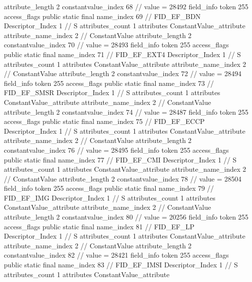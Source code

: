 {{{{{{{					attribute_length	2
					constantvalue_index	68		// value = 28492
				}
				}
			}
			field_info {
				token	255
				access_flags	public static final
				name_index	69		// FID_EF_BDN
				Descriptor_Index	1		// S
				attributes_count	1
				attributes {
				ConstantValue_attribute {
					attribute_name_index	2		// ConstantValue
					attribute_length	2
					constantvalue_index	70		// value = 28493
				}
				}
			}
			field_info {
				token	255
				access_flags	public static final
				name_index	71		// FID_EF_EXT4
				Descriptor_Index	1		// S
				attributes_count	1
				attributes {
				ConstantValue_attribute {
					attribute_name_index	2		// ConstantValue
					attribute_length	2
					constantvalue_index	72		// value = 28494
				}
				}
			}
			field_info {
				token	255
				access_flags	public static final
				name_index	73		// FID_EF_SMSR
				Descriptor_Index	1		// S
				attributes_count	1
				attributes {
				ConstantValue_attribute {
					attribute_name_index	2		// ConstantValue
					attribute_length	2
					constantvalue_index	74		// value = 28487
				}
				}
			}
			field_info {
				token	255
				access_flags	public static final
				name_index	75		// FID_EF_ECCP
				Descriptor_Index	1		// S
				attributes_count	1
				attributes {
				ConstantValue_attribute {
					attribute_name_index	2		// ConstantValue
					attribute_length	2
					constantvalue_index	76		// value = 28495
				}
				}
			}
			field_info {
				token	255
				access_flags	public static final
				name_index	77		// FID_EF_CMI
				Descriptor_Index	1		// S
				attributes_count	1
				attributes {
				ConstantValue_attribute {
					attribute_name_index	2		// ConstantValue
					attribute_length	2
					constantvalue_index	78		// value = 28504
				}
				}
			}
			field_info {
				token	255
				access_flags	public static final
				name_index	79		// FID_EF_IMG
				Descriptor_Index	1		// S
				attributes_count	1
				attributes {
				ConstantValue_attribute {
					attribute_name_index	2		// ConstantValue
					attribute_length	2
					constantvalue_index	80		// value = 20256
				}
				}
			}
			field_info {
				token	255
				access_flags	public static final
				name_index	81		// FID_EF_LP
				Descriptor_Index	1		// S
				attributes_count	1
				attributes {
				ConstantValue_attribute {
					attribute_name_index	2		// ConstantValue
					attribute_length	2
					constantvalue_index	82		// value = 28421
				}
				}
			}
			field_info {
				token	255
				access_flags	public static final
				name_index	83		// FID_EF_IMSI
				Descriptor_Index	1		// S
				attributes_count	1
				attributes {
				ConstantValue_attribute {
}}}}}}}
